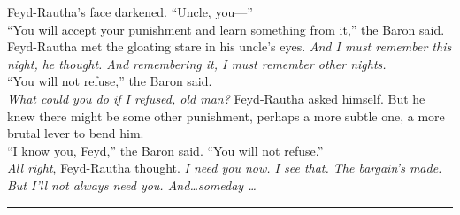 \documentclass[12pt,letterpaper,draft]{memoir}
\begin{document}
Feyd-Rautha’s face darkened. “Uncle, you—”\\
“You will accept your punishment and learn something from it,” the Baron said.\\
Feyd-Rautha met the gloating stare in his uncle’s eyes. \textit{And I must remember this night, he thought. And remembering it, I must remember other nights.}\\
“You will not refuse,” the Baron said.\\
\textit{What could you do if I refused, old man?} Feyd-Rautha asked himself. But he knew there might be some other punishment, perhaps a more subtle one, a more brutal lever to bend him.\\
“I know you, Feyd,” the Baron said. “You will not refuse.”\\
\textit{All right}, Feyd-Rautha thought. \textit{I need you now. I see that. The bargain’s made. But I’ll not always need you. And\ldots someday \ldots} 
\fancybreak{* * *}
\end{document}
